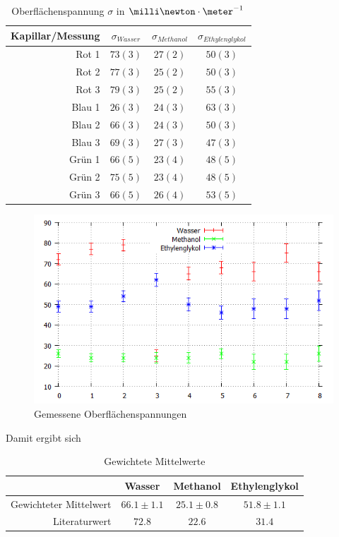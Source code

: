 \documentclass[12pt, a4paper, twoside]{scrartcl}
\begin{document}
\begin{table}[!h]
\centering
\begin{tabular}{r|c|c|c}
    Kapillar/Messung & $\sigma _{Wasser}$ & $\sigma _{Methanol}$ & $\sigma _{Ethylenglykol}$\\
    \hline
    Rot 1 & $ 73(3)$ & $ 27(2)$ & $ 50(3)$\\
    Rot 2 & $ 77(3)$ & $ 25(2)$ & $ 50(3)$\\
    Rot 3 & $ 79(3)$ & $ 25(2)$ & $ 55(3)$ \\
    \hline
    Blau 1 & $ 26(3)$ & $ 24(3)$ & $ 63(3)$ \\
    Blau 2 & $ 66(3)$ & $ 24(3)$ & $ 50(3)$ \\
    Blau 3 & $ 69(3)$ & $ 27(3)$ & $ 47(3)$ \\
    \hline
    Grün 1 & $ 66(5)$ & $ 23(4)$ & $ 48(5)$ \\
    Grün 2 & $ 75(5)$ & $ 23(4)$ & $ 48(5)$ \\
    Grün 3 & $ 66(5)$ & $ 26(4)$ & $ 53(5)$ \\
    
 \end{tabular} 
 \caption{\label{tab:oberflaechenspannung}Oberflächenspannung $\sigma$ in $\milli\newton\cdot\meter^{-1}$}
\end{table}

\begin{figure}[!h]
\centering
\includegraphics[scale=0.6]{ofs.png}
\caption{\label{img:ofs} Gemessene Oberflächenspannungen}
\end{figure}

Damit ergibt sich 
\begin{table}[!h]
\centering
\begin{tabular}{r|c|c|c}
    & Wasser & Methanol & Ethylenglykol\\
    \hline
    Gewichteter Mittelwert & $66.1\pm1.1$ & $25.1\pm0.8$ & $51.8\pm1.1$ \\
    \hline
    Literaturwert & $72.8$ & $22.6$ & $31.4$ \\
 \end{tabular} 
 \caption{Gewichtete Mittelwerte}
\end{table}
\end{document}
